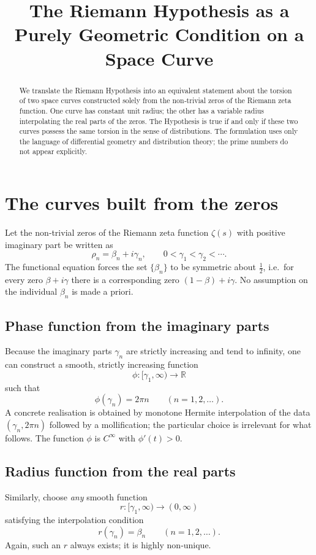 \documentclass[12pt,a4paper]{article}
\title{\bf The Riemann Hypothesis as a Purely Geometric Condition on a Space Curve}
\author{}
\date{}
\newcommand{\R}{\mathbb{R}}
\begin{document}
\maketitle

\begin{abstract}
We translate the Riemann Hypothesis into an equivalent statement about the torsion of two space curves constructed solely from the non‑trivial zeros of the Riemann zeta function.  One curve has constant unit radius; the other has a variable radius interpolating the real parts of the zeros.  The Hypothesis is true if and only if these two curves possess the same torsion in the sense of distributions.  The formulation uses only the language of differential geometry and distribution theory; the prime numbers do not appear explicitly.
\end{abstract}

\section{The curves built from the zeros}

Let the non‑trivial zeros of the Riemann zeta function $\zeta(s)$ with positive imaginary part be written as
\[
\rho_n = \beta_n + i\gamma_n , \qquad 0<\gamma_1<\gamma_2<\cdots .
\]
The functional equation forces the set $\{\beta_n\}$ to be symmetric about $\tfrac12$, i.e.\ for every zero $\beta+i\gamma$ there is a corresponding zero $(1-\beta)+i\gamma$.
No assumption on the individual $\beta_n$ is made a priori.

\subsection{Phase function from the imaginary parts}
Because the imaginary parts $\gamma_n$ are strictly increasing and tend to infinity, one can construct a smooth, strictly increasing function
\[
\phi:[\gamma_1,\infty)\longrightarrow\R
\]
such that
\[
\phi(\gamma_n)=2\pi n \qquad (n=1,2,\dots).
\]
A concrete realisation is obtained by monotone Hermite interpolation of the data $(\gamma_n,2\pi n)$ followed by a mollification; the particular choice is irrelevant for what follows.  The function $\phi$ is $C^\infty$ with $\phi'(t)>0$.

\subsection{Radius function from the real parts}
Similarly, choose \emph{any} smooth function
\[
r:[\gamma_1,\infty)\longrightarrow(0,\infty)
\]
satisfying the interpolation condition
\[
r(\gamma_n)=\beta_n \qquad (n=1,2,\dots).
\]
Again, such an $r$ always exists; it is highly non‑unique.
\end{document}
